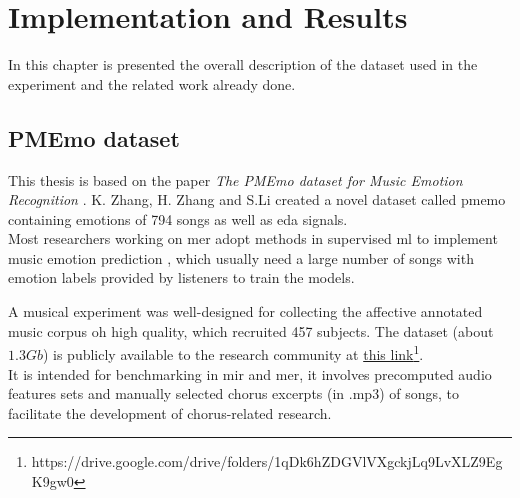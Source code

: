 \chapter{Implementation and Results}
\label{chap:Implementation}
\pagestyle{plain}
\vspace{0.5cm}

\noindent In this chapter is presented the overall description of the dataset used in the experiment and the related work already done.

\section{PMEmo dataset}
This thesis is based on the paper \textit{The PMEmo dataset for Music Emotion Recognition} \cite{zhang2018pmemo}. K. Zhang, H. Zhang and S.Li created a novel dataset called \gls{pmemo} containing emotions of 794 songs as well as \gls{eda} signals.
\\

Most researchers working on \gls{mer} adopt methods in supervised \gls{ml} to implement music emotion prediction \cite{yang2012machine}, which usually need a large number of songs with emotion labels provided by listeners to train the models.

A musical experiment was well-designed for collecting the affective annotated music corpus oh high quality, which recruited 457 subjects.
The dataset (about $1.3Gb$) is publicly available to the research community at \href{https://drive.google.com/drive/folders/1qDk6hZDGVlVXgckjLq9LvXLZ9EgK9gw0}{this link}\footnote{https://drive.google.com/drive/folders/1qDk6hZDGVlVXgckjLq9LvXLZ9EgK9gw0}.
\\
It is intended for benchmarking in \gls{mir} and \gls{mer}, it involves precomputed audio features sets and manually selected chorus excerpts (in .mp3) of songs, to facilitate the development of chorus-related research.

